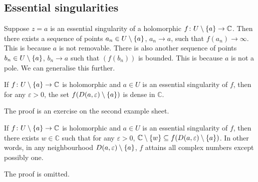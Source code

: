 \subsection{Essential singularities}
\begin{remark}
	Suppose \( z = a \) is an essential singularity of a holomorphic \( f \colon U \setminus \qty{a} \to \mathbb C \).
	Then there exists a sequence of points \( a_n \in U \setminus \qty{a} \), \( a_n \to a \), such that \( f(a_n) \to \infty \).
	This is because \( a \) is not removable.
	There is also another sequence of points \( b_n \in U \setminus \qty{a} \), \( b_n \to a \) such that \( (f(b_n)) \) is bounded.
	This is because \( a \) is not a pole.
	We can generalise this further.
\end{remark}
\begin{theorem}
	If \( f \colon U \setminus \qty{a} \to \mathbb C \) is holomorphic and \( a \in U \) is an essential singularity of \( f \), then for any \( \varepsilon > 0 \), the set \( f(D(a,\varepsilon) \setminus \qty{a}) \) is dense in \( \mathbb C \).
\end{theorem}
The proof is an exercise on the second example sheet.
\begin{theorem}
	If \( f \colon U \setminus \qty{a} \to \mathbb C \) is holomorphic and \( a \in U \) is an essential singularity of \( f \), then there exists \( w \in \mathbb C \) such that for any \( \varepsilon > 0 \), \( \mathbb C \setminus \qty{w} \subseteq f(D(a,\varepsilon) \setminus \qty{a}) \).
	In other words, in any neighbourhood \( D(a,\varepsilon) \setminus \qty{a} \), \( f \) attains all complex numbers except possibly one.
\end{theorem}
The proof is omitted.

